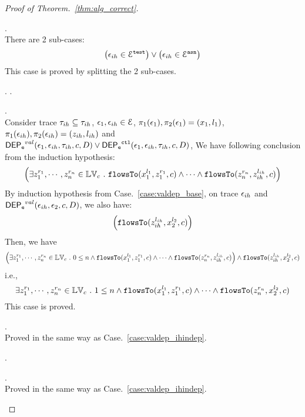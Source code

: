 \begin{proof}[Proof of Theorem.~\ref{thm:alg_correct}]
\begin{case}
\begin{subcase}
\label{case:valdep_ihdep}.
\\
There are 2 sub-cases: 
%
 \[
 \big(\mathtt{\epsilon}_{ih} \in \mathcal{E}^{\mathtt{{test}}}\big) \lor \big(\mathtt{\epsilon}_{ih} \in \mathcal{E}^{\mathtt{{asn}}}\big)
 \]
%
This case is proved by splitting the 2 sub-cases.
\begin{subsubcase}.
\label{case:valdep_ihdepasn}.
\begin{subsubsubcase}.
\\
Consider trace $\mathtt{\tau}_{ih} \subseteq \mathtt{\tau}_{ih}$,  $\mathtt{\epsilon}_1, \mathtt{\epsilon}_{ih} \in \mathcal{E}$, 
$\pi_1(\mathtt{\epsilon}_1), \pi_2(\mathtt{\epsilon}_1) = (x_1, l_1)$, $\pi_1(\mathtt{\epsilon}_{ih}), \pi_2(\mathtt{\epsilon}_{ih}) = (z_{ih}, l_{ih})$ and
$\mathsf{DEP_{\mathtt{e}}}^{val}(\mathtt{\epsilon}_1, \mathtt{\epsilon}_{ih}, \mathtt{\tau}_{ih}, c, D) \lor \mathsf{DEP_{\mathtt{e}}}^{\mathtt{{ctl}}}(\mathtt{\epsilon}_1, \mathtt{\epsilon}_{ih}, \mathtt{\tau}_{ih}, c, D) $, 
We have following conclusion from the induction hypothesis:
%
\[
\Big(\exists z_1^{r_1}, \cdots, z_n^{r_n} \in \mathbb{LV}_{{c}} ~.~ \mathtt{flowsTo}(x_1^{l_1}, z_1^{r_1}, c) \land \cdots \land \mathtt{flowsTo}(z_n^{r_n}, z_{ih}^{l_{ih}}, c) \Big)
\]
%
By induction hypothesis from Case.~\ref{case:valdep_base}, on trace $\mathtt{\epsilon}_{ih}$ and $\mathsf{DEP_{\mathtt{e}}}^{val}(\mathtt{\epsilon}_{ih}, \mathtt{\epsilon}_2, c, D)$,
we also have:
\[
\Big( \mathtt{flowsTo}(z_{ih}^{l_{ih}}, {x}_2^{l_2}, c) \Big)
\]
%
Then, we have
%
\[
\Big(\exists z_1^{r_1}, \cdots, z_n^{r_n} \in \mathbb{LV}_{{c}} ~.~  0 \leq n \land
 \mathtt{flowsTo}(x_1^{l_1}, z_1^{r_1}, c) \land \cdots \land \mathtt{flowsTo}(z_n^{r_n}, z_{ih}^{l_{ih}}, c)
  \Big)\land \mathtt{flowsTo}(z_{ih}^{l_{ih}}, {x}_2^{l_2}, c)
\]
%
i.e.,
\[
\exists z_1^{r_1}, \cdots, z_n^{r_n} \in \mathbb{LV}_{{c}} ~.~ 1 \leq n \land \mathtt{flowsTo}(x_1^{l_1}, z_1^{r_1}, c) \land \cdots 
\land \mathtt{flowsTo}(z_n^{r_n}, {x}_2^{l_2}, c)
\]
%
This case is proved.
\end{subsubsubcase}
\begin{subsubsubcase}.
\\
Proved in the same way as Case.~\ref{case:valdep_ihindep}.
\end{subsubsubcase}
\end{subsubcase}
\begin{subsubcase}.
\begin{subsubsubcase}.
\\
Proved in the same way as Case.~\ref{case:valdep_ihindep}.
\end{subsubsubcase}

\end{subsubcase}
\end{subcase}
\end{case}
\end{proof}
